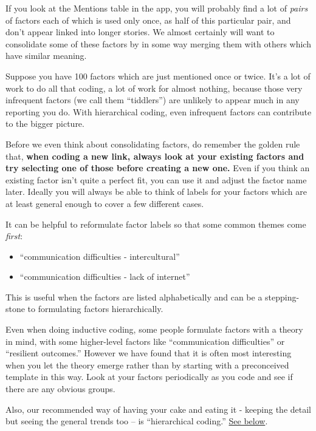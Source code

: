 \documentclass[
]{book}
\providecommand{\tightlist}{%
  \setlength{\itemsep}{0pt}\setlength{\parskip}{0pt}}
\begin{document}
If you look at the Mentions table in the app, you will probably find a lot of \emph{pairs} of factors each of which is used only once, as half of this particular pair, and don't appear linked into longer stories. We almost certainly will want to consolidate some of these factors by in some way merging them with others which have similar meaning.

Suppose you have 100 factors which are just mentioned once or twice. It's a lot of work to do all that coding, a lot of work for almost nothing, because those very infrequent factors (we call them ``tiddlers'') are unlikely to appear much in any reporting you do. With hierarchical coding, even infrequent factors can contribute to the bigger picture.

Before we even think about consolidating factors, do remember the golden rule that, \textbf{when coding a new link, always look at your existing factors and try selecting one of those before creating a new one.} Even if you think an existing factor isn't quite a perfect fit, you can use it and adjust the factor name later. Ideally you will always be able to think of labels for your factors which are at least general enough to cover a few different cases.

It can be helpful to reformulate factor labels so that some common themes come \emph{first}:

\begin{itemize}
\tightlist
\item
  ``communication difficulties - intercultural''
\item
  ``communication difficulties - lack of internet''
\end{itemize}

This is useful when the factors are listed alphabetically and can be a stepping-stone to formulating factors hierarchically.

Even when doing inductive coding, some people formulate factors with a theory in mind, with some higher-level factors like ``communication difficulties'' or ``resilient outcomes.'' However we have found that it is often most interesting when you let the theory emerge rather than by starting with a preconceived template in this way. Look at your factors periodically as you code and see if there are any obvious groups.

Also, our recommended way of having your cake and eating it - keeping the detail but seeing the general trends too -- is ``hierarchical coding.'' \href{https://guide.causalmap.app/creating.html\#simplifying-causal-maps-with-hierarchical-coding}{See below}.
\end{document}
